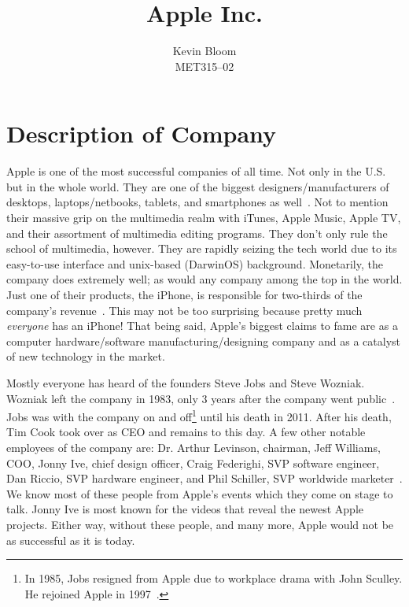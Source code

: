 \documentclass[12pt,a4paper,titlepage]{article}
\begin{document}
\title{Apple Inc.}
\author{Kevin Bloom \\ MET315--02}
\maketitle

\newpage

\tableofcontents

\newpage


\section{Description of Company}
Apple is one of the most successful companies of all time. Not only in the
U.S. but in the whole world. They are one of the biggest designers/manufacturers
of desktops, laptops/netbooks, tablets, and smartphones as
well~\cite{hoover}. Not to mention their massive grip on the multimedia realm
with iTunes, Apple Music, Apple TV, and their assortment of multimedia editing
programs. They don't only rule the school of multimedia, however. They are
rapidly seizing the tech world due to its easy-to-use interface and unix-based
(DarwinOS) background. Monetarily, the company does extremely well; as would any
company among the top in the world. Just one of their products, the iPhone, is
responsible for two-thirds of the company's revenue~\cite{hoover}. This may not
be too surprising because pretty much \emph{everyone} has an iPhone! That being
said, Apple's biggest claims to fame are as a computer hardware/software
manufacturing/designing company and as a catalyst of new technology in the
market.

Mostly everyone has heard of the founders Steve Jobs and Steve Wozniak. Wozniak
left the company in 1983, only 3 years after the company went
public~\cite{hoover}. Jobs was with the company on and off\footnote{In 1985,
  Jobs resigned from Apple due to workplace drama with John Sculley. He rejoined
  Apple in 1997~\cite{jobs}.} until his death in 2011. After his death, Tim Cook
took over as CEO and remains to this day. A few other notable employees of the
company are: Dr. Arthur Levinson, chairman, Jeff Williams, COO, Jonny Ive, chief
design officer, Craig Federighi, SVP software engineer, Dan Riccio, SVP hardware
engineer, and Phil Schiller, SVP worldwide marketer~\cite{hoover}. We know most
of these people from Apple's events which they come on stage to talk. Jonny Ive
is most known for the videos that reveal the newest Apple projects. Either way,
without these people, and many more, Apple would not be as successful as it is
today.
\end{document}
